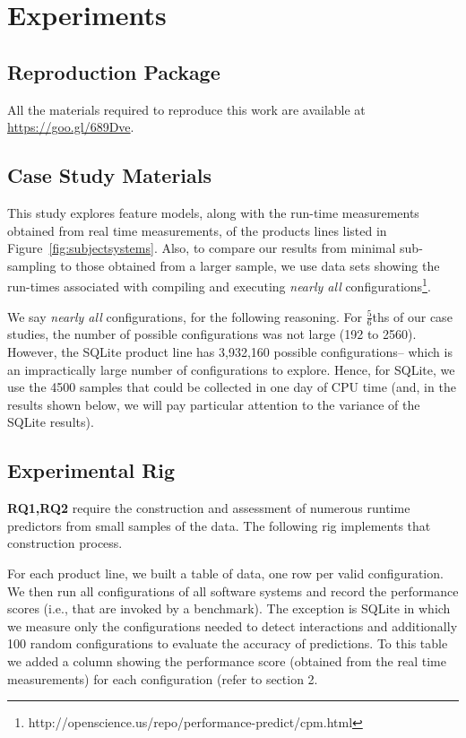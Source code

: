 \documentclass{sig-alternative}
\newcommand{\fig}[1]{Figure~\ref{fig:#1}}
\begin{document}
\section{Experiments}

\subsection{Reproduction Package}

All the materials required to reproduce this work are available at \url{https://goo.gl/689Dve}.

\subsection{Case Study Materials}

This study explores feature models, along with the run-time measurements obtained from real time measurements, of the products lines listed in \fig{subjectsystems}.
Also, to compare our results from minimal sub-sampling to those obtained 
from a larger sample, we use data sets showing the run-times associated with
compiling and executing {\em nearly all} configurations\footnote{http://openscience.us/repo/performance-predict/cpm.html}.

We say {\em nearly all} configurations, for the following reasoning. For 
$\frac{5}{6}$ths of our case studies, the number of possible configurations
was not large (192 to 2560). However, the SQLite product line has 3,932,160 
possible configurations-- which is an impractically large number of configurations to explore. Hence, for SQLite, we use the 4500 samples that could
be collected in one day of CPU time (and, in the results shown below,
we will pay particular attention to the variance of the SQLite results).

\subsection{Experimental Rig}


{\bf RQ1,RQ2} require the construction and assessment of numerous runtime predictors from small samples
of the data. The following rig implements that construction process.

For each product line, we built a table of data, one row per valid configuration. We then run all configurations of all software systems
and record the performance scores (i.e., that are invoked by a benchmark).
The exception is SQLite in which we measure only the
configurations needed to detect interactions and additionally
100 random configurations to evaluate the accuracy of
predictions.  
To this table we added a column showing the performance score (obtained from the real time measurements) for each configuration (refer to section 2.
\end{document}

